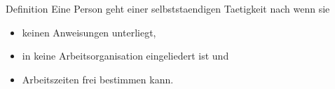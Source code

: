 
\begin{frame}{Definition}
  Eine Person geht einer selbststaendigen Taetigkeit nach wenn sie
  \begin{itemize}
  \item keinen Anweisungen unterliegt,
  \item in keine Arbeitsorganisation eingeliedert ist und
  \item Arbeitszeiten frei bestimmen kann.
  \end{itemize}
\end{frame}
